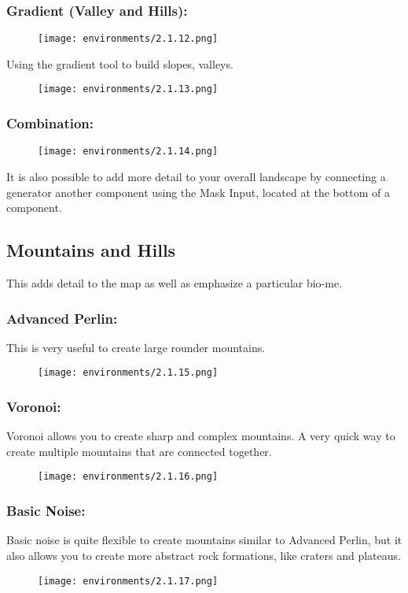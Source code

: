 \documentclass[../main.tex]{subfiles}
\begin{document}
\subsubsection{Gradient (Valley and Hills):}
\begin{figure}[H]
\texttt{[image: environments/2.1.12.png]}
\end{figure}
Using the gradient tool to build slopes, valleys.
\begin{figure}[H]
\texttt{[image: environments/2.1.13.png]}
\end{figure}
\subsubsection{Combination:}
\begin{figure}[H]
\texttt{[image: environments/2.1.14.png]}
\end{figure}
It is also possible to add more detail to your overall landscape by connecting a generator another component using the Mask Input, located at the bottom of a component.

\subsection{Mountains and Hills}
This adds detail to the map as well as emphasize a particular bio-me.
\subsubsection{Advanced Perlin:}
This is very useful to create large rounder mountains.
\begin{figure}[H]
\texttt{[image: environments/2.1.15.png]}
\end{figure}
\subsubsection{Voronoi:}
Voronoi allows you to create sharp and complex mountains. A very quick way to create multiple mountains that are connected together.
\begin{figure}[H]
\texttt{[image: environments/2.1.16.png]}
\end{figure}

\subsubsection{Basic Noise:}
Basic noise is quite flexible to create mountains similar to Advanced Perlin, but it also allows you to create more abstract rock formations, like craters and plateaus.
\begin{figure}[H]
\texttt{[image: environments/2.1.17.png]}
\end{figure}
\end{document}

